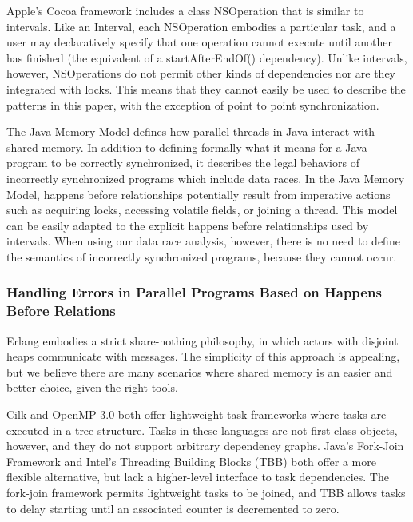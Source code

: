 Apple's Cocoa framework includes a class NSOperation \cite{Apple2008}
that is similar to intervals. Like an Interval, each NSOperation
embodies a particular task, and a user may declaratively specify that
one operation cannot execute until another has finished (the
equivalent of a startAfterEndOf() dependency). Unlike intervals,
however, NSOperations do not permit other kinds of dependencies nor
are they integrated with locks. This means that they cannot easily be
used to describe the patterns in this paper, with the exception of
point to point synchronization.

The Java Memory Model \cite{Manson2005} defines how parallel threads in
Java interact with shared memory. In addition to defining formally
what it means for a Java program to be correctly synchronized, it
describes the legal behaviors of incorrectly synchronized programs
which include data races. In the Java Memory Model, happens before
relationships potentially result from imperative actions such as
acquiring locks, accessing volatile fields, or joining a thread. This
model can be easily adapted to the explicit happens before
relationships used by intervals. When using our data race analysis,
however, there is no need to define the semantics of incorrectly
synchronized programs, because they cannot occur.

\subsubsection{Handling Errors in Parallel Programs Based on Happens
  Before Relations \cite{Matsakis2010a}}

Erlang \cite{Erlang2010} embodies a strict share-nothing philosophy,
in which actors with disjoint heaps communicate with messages. The
simplicity of this approach is appealing, but we believe there are
many scenarios where shared memory is an easier and better choice,
given the right tools.

Cilk \cite{Blumofe1995, Frigo1998} and OpenMP 3.0 \cite{OpenMP2008}
both offer lightweight task frameworks where tasks are executed in a
tree structure.  Tasks in these languages are not first-class objects,
however, and they do not support arbitrary dependency graphs. Java's
Fork-Join Framework \cite{Lea2006, Lea2000, Lea2000a} and Intel's
Threading Building Blocks (TBB) \cite{Reinders2007, Contreras2008}
both offer a more flexible alternative, but lack a higher-level
interface to task dependencies. The fork-join framework permits
lightweight tasks to be joined, and TBB allows tasks to delay starting
until an associated counter is decremented to zero.


